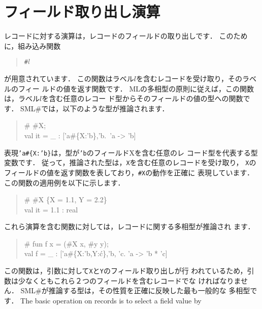 \documentclass{jbook}
\newif\ifjp
\newcommand{\txt}[2]{#1}
\newcommand{\smlsharp}{SML\#}
\begin{document}
\section{\txt{フィールド取り出し演算}{Field selection operation}}
\label{sec:extensionFieldselection}

\ifjp%
	レコードに対する演算は，レコードのフィールドの取り出しです．
	このために，組み込み関数
\begin{tt}\begin{quote}
{\tt \#$l$}
\end{quote}\end{tt}
が用意されています．
	この関数はラベル$l$を含むレコードを受け取り，そのラベルのフィー
ルドの値を返す関数です．
	MLの多相型の原則に従えば，この関数は，ラベル$l$を含む任意のレコー
ド型からそのフィールドの値の型への関数です．
	\smlsharp{}では，以下のような型が推論されます．
\begin{tt}\begin{quote}
\# \#X;\\
val it = \_ : ['a\#\{X:'b\},'b.~'a -> 'b]
\end{quote}\end{tt}
	表現{\tt 'a\#\{X:'b\}}は，型が{\tt 'b}のフィールドXを含む任意のレ
コード型を代表する型変数です．
	従って，推論された型は，{\tt X}を含む任意のレコードを受け取り，
{\tt X}のフィールドの値を返す関数を表しており，{\tt \#X}の動作を正確に
表現しています．
	この関数の適用例を以下に示します．
\begin{tt}\begin{quote}
\# \#X \{X = 1.1, Y = 2.2\}\\
val it = 1.1 : real
\end{quote}\end{tt}
	これら演算を含む関数に対しては，レコードに関する多相型が推論され
ます．
\begin{tt}\begin{quote}
\# fun f x = (\#X x, \#y y);\\
val f = \_ : ['a\#\{X:'b,Y:\'c\},'b, 'c. 'a -> 'b * 'c]
\end{quote}\end{tt}
	この関数は，引数に対して{\tt X}と{\tt Y}のフィールド取り出しが行
われているため，引数は少なくともこれら２つのフィールドを含むレコードでな
ければなりません．
	\smlsharp{}が推論する型は，その性質を正確に反映した最も一般的な
多相型です．
\else%
	The basic operation on records is to select a field value by
\end{document}
